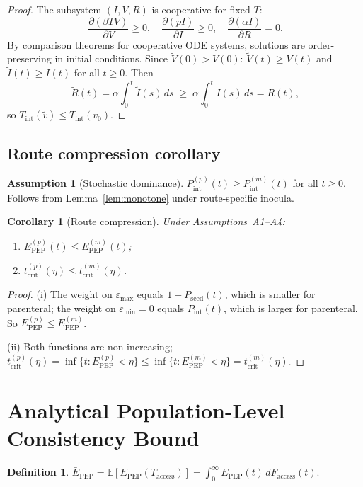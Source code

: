 \documentclass[11pt]{article}
\newtheorem{corollary}{Corollary}[section]
\theoremstyle{definition}
\newtheorem{definition}{Definition}[section]
\newtheorem{assumption}{Assumption}[section]
\theoremstyle{remark}
\newcommand{\Tint}{T_{\text{int}}}
\newcommand{\Pseed}{P_{\text{seed}}}
\newcommand{\Pint}{P_{\text{int}}}
\newcommand{\Epep}{E_{\text{PEP}}}
\newcommand{\Ebarpep}{\bar{E}_{\text{PEP}}}
\newcommand{\Faccess}{F_{\text{access}}}
\newcommand{\tcrit}{t_{\text{crit}}}
\newcommand{\emax}{\varepsilon_{\max}}
\newcommand{\emin}{\varepsilon_{\min}}
\begin{document}
\begin{proof}
The subsystem $(I, V, R)$ is cooperative for fixed $T$:
\[
\frac{\partial(\beta TV)}{\partial V} \geq 0, \quad
\frac{\partial(pI)}{\partial I} \geq 0, \quad
\frac{\partial(\alpha I)}{\partial R} = 0.
\]
By comparison theorems for cooperative ODE systems\cite{smith1995}, solutions are order-preserving in initial conditions. Since $\tilde{V}(0) > V(0)$: $\tilde{V}(t) \geq V(t)$ and $\tilde{I}(t) \geq I(t)$ for all $t \geq 0$. Then
\[
\tilde{R}(t) = \alpha \int_{0}^{t} \tilde{I}(s)\,ds \;\geq\; \alpha \int_{0}^{t} I(s)\,ds = R(t),
\]
so $\Tint(\tilde{v}) \leq \Tint(v_{0})$.
\end{proof}

\subsection{Route compression corollary}

\begin{assumption}[Stochastic dominance]
$\Pint^{(p)}(t) \geq \Pint^{(m)}(t)$ for all $t \geq 0$. Follows from Lemma~\ref{lem:monotone} under route-specific inocula.
\end{assumption}

\begin{corollary}[Route compression]\label{cor:route}
Under Assumptions~A1--A4:
\begin{enumerate}[label=\textnormal{(\roman*)},leftmargin=2.5em]
    \item $\Epep^{(p)}(t) \leq \Epep^{(m)}(t)$;
    \item $\tcrit^{(p)}(\eta) \leq \tcrit^{(m)}(\eta)$.
\end{enumerate}
\end{corollary}

\begin{proof}
(i) The weight on $\emax$ equals $1 - \Pseed(t)$, which is smaller for parenteral; the weight on $\emin = 0$ equals $\Pint(t)$, which is larger for parenteral. So $\Epep^{(p)} \leq \Epep^{(m)}$.

(ii) Both functions are non-increasing; $\tcrit^{(p)}(\eta) = \inf\{t : \Epep^{(p)} < \eta\} \leq \inf\{t : \Epep^{(m)} < \eta\} = \tcrit^{(m)}(\eta)$.
\end{proof}


\section{Analytical Population-Level Consistency Bound}
\begin{definition}
$\Ebarpep = \mathbb{E}[\Epep(T_{\text{access}})] = \int_{0}^{\infty} \Epep(t)\,d\Faccess(t)$.
\end{definition}
\end{document}
